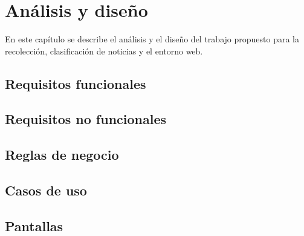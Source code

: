 \chapter{Análisis y diseño}\label{chp:introduccion}

En este capítulo se describe el análisis y el diseño del trabajo propuesto para
la recolección, clasificación de noticias y el entorno web.

\section{Requisitos funcionales}


\section{Requisitos no funcionales}


\section{Reglas de negocio}



\newpage
\section{Casos de uso}



{\setlength{\parindent}{0pt}%
  
  \newpage
  
  \newpage
  
  \newpage
  
  \newpage
  
  \newpage
  
  \newpage
  
  \newpage
}
\section{Pantallas}


\newpage

\newpage

\newpage

\newpage




